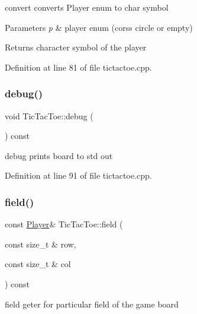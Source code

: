 convert converts Player enum to char symbol 


\begin{DoxyParams}{Parameters}
{\em p} & player enum (corss circle or empty) \\
\hline
\end{DoxyParams}
\begin{DoxyReturn}{Returns}
character symbol of the player 
\end{DoxyReturn}


Definition at line 81 of file tictactoe.\+cpp.

\mbox{\label{class_tic_tac_toe_a3b71a1e724f9af69d0fb8ba3dd848942}} 
\subsubsection{\texorpdfstring{debug()}{debug()}}
{\footnotesize\ttfamily void Tic\+Tac\+Toe\+::debug (\begin{DoxyParamCaption}{ }\end{DoxyParamCaption}) const}



debug prints board to std out 



Definition at line 91 of file tictactoe.\+cpp.

\mbox{\label{class_tic_tac_toe_abafc7ee6550f447cf9e4c798a3658ab7}} 
\subsubsection{\texorpdfstring{field()}{field()}}
{\footnotesize\ttfamily const \hyperlink{common__defs_8h_a9c8780378078e51e7c9041cbac392db9}{Player}\& Tic\+Tac\+Toe\+::field (\begin{DoxyParamCaption}\item[{const size\+\_\+t \&}]{row,  }\item[{const size\+\_\+t \&}]{col }\end{DoxyParamCaption}) const\hspace{0.3cm}{\ttfamily [inline]}}



field geter for particular field of the game board 


